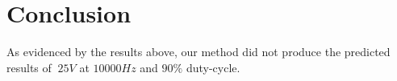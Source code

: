 \section{Conclusion}
As evidenced by the results above, our method did not produce the predicted results of $~25V$ at $10 000Hz$ and $90\%$ duty-cycle.
